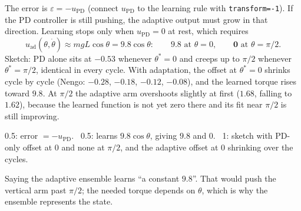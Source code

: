 \documentclass[11pt,letterpaper]{article}
\newcommand{\ans}[1]{\par\vspace{4pt}{\bfseries #1}\quad}
\begin{document}
\ans{(b) [2]}
The error is $\varepsilon = -u_{\mathrm{PD}}$ (connect $u_{\mathrm{PD}}$ to the learning rule with \texttt{transform=-1}). If the PD controller is still pushing, the adaptive output must grow in that direction. Learning stops only when $u_{\mathrm{PD}} = 0$ at rest, which requires
\[
u_{\mathrm{ad}}(\theta, \dot\theta) \approx mgL\cos\theta = 9.8\cos\theta: \qquad \mathbf{9.8} \text{ at } \theta = 0, \qquad \mathbf{0} \text{ at } \theta = \pi/2.
\]
Sketch: PD alone sits at $-0.53$ whenever $\theta^* = 0$ and creeps up to $\pi/2$ whenever $\theta^* = \pi/2$, identical in every cycle. With adaptation, the offset at $\theta^* = 0$ shrinks cycle by cycle (Nengo: $-0.28$, $-0.18$, $-0.12$, $-0.08$), and the learned torque rises toward $9.8$. At $\pi/2$ the adaptive arm overshoots slightly at first ($1.68$, falling to $1.62$), because the learned function is not yet zero there and its fit near $\pi/2$ is still improving.
\begin{center}
\end{center}
\begin{marking}
0.5: error $= -u_{\mathrm{PD}}$. \ 0.5: learns $9.8\cos\theta$, giving $9.8$ and $0$. \ 1: sketch with PD-only offset at $0$ and none at $\pi/2$, and the adaptive offset at $0$ shrinking over the cycles.
\end{marking}
\begin{trap}
Saying the adaptive ensemble learns ``a constant $9.8$''. That would push the vertical arm past $\pi/2$; the needed torque depends on $\theta$, which is why the ensemble represents the state.
\end{trap}
\end{document}
